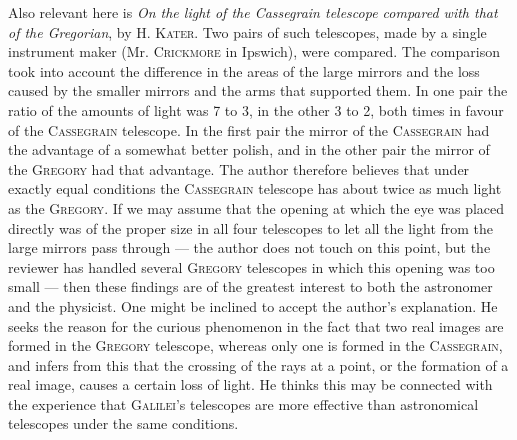 Also relevant here is \emph{On the light of the Cassegrain telescope compared with that of the Gregorian}, by H. \textsc{Kater}. Two pairs of such telescopes, made by a single instrument maker (Mr. \textsc{Crickmore} in Ipswich), were compared. The comparison took into account the difference in the areas of the large mirrors and the loss caused by the smaller mirrors and the arms that supported them. In one pair the ratio of the amounts of light was 7 to 3, in the other 3 to 2, both times in favour of the \textsc{Cassegrain} telescope. In the first pair the mirror of the \textsc{Cassegrain} had the advantage of a somewhat better polish, and in the other pair the mirror of the \textsc{Gregory} had that advantage. The author therefore believes that under exactly equal conditions the \textsc{Cassegrain} telescope has about twice as much light as the \textsc{Gregory}. If we may assume that the opening at which the eye was placed directly was of the proper size in all four telescopes to let all the light from the large mirrors pass through — the author does not touch on this point, but the reviewer has handled several \textsc{Gregory} telescopes in which this opening was too small — then these findings are of the greatest interest to both the astronomer and the physicist. One might be inclined to accept the author's explanation. He seeks the reason for the curious phenomenon in the fact that two real images are formed in the \textsc{Gregory} telescope, whereas only one is formed in the \textsc{Cassegrain}, and infers from this that the crossing of the rays at a point, or the formation of a real image, causes a certain loss of light. He thinks this may be connected with the experience that \textsc{Galilei}’s telescopes are more effective than astronomical telescopes under the same conditions.
